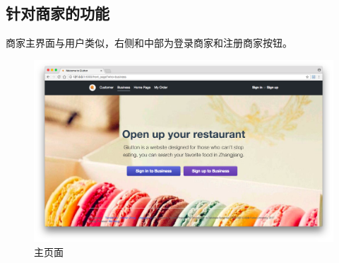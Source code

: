 \documentclass[12pt, oneside,a4paper]{article}
\begin{document}
 \subsection{针对商家的功能}
 商家主界面与用户类似，右侧和中部为登录商家和注册商家按钮。
 \begin{figure}[H]
   \centering
     \includegraphics[width=5.80in]{re-front.png}
     \caption{\small{主页面}}
  \end{figure}
\end{document}
